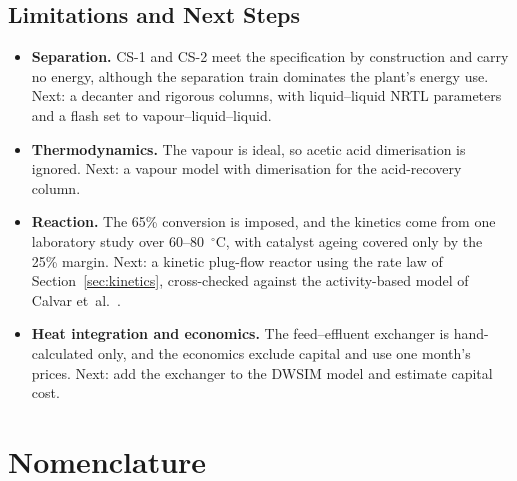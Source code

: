 \documentclass[10pt,a4paper]{article}
\begin{document}
\subsection{Limitations and Next Steps}
\begin{itemize}
    \item \textbf{Separation.} CS-1 and CS-2 meet the specification by construction and carry no energy, although the separation train dominates the plant's energy use. Next: a decanter and rigorous columns, with liquid--liquid NRTL parameters and a flash set to vapour--liquid--liquid.
    \item \textbf{Thermodynamics.} The vapour is ideal, so acetic acid dimerisation is ignored. Next: a vapour model with dimerisation for the acid-recovery column.
    \item \textbf{Reaction.} The 65\% conversion is imposed, and the kinetics come from one laboratory study over 60--80~$^\circ$C, with catalyst ageing covered only by the 25\% margin. Next: a kinetic plug-flow reactor using the rate law of Section~\ref{sec:kinetics}, cross-checked against the activity-based model of Calvar et~al.~\cite{ref23}.
    \item \textbf{Heat integration and economics.} The feed--effluent exchanger is hand-calculated only, and the economics exclude capital and use one month's prices. Next: add the exchanger to the DWSIM model and estimate capital cost.
\end{itemize}

\clearpage
\section*{Nomenclature}
\end{document}

